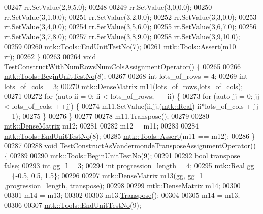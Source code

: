 \begin{DoxyCode}
00247   rr.SetValue(2,9,5.0);
00248 
00249   rr.SetValue(3,0,0.0);
00250   rr.SetValue(3,1,0.0);
00251   rr.SetValue(3,2,0.0);
00252   rr.SetValue(3,3,0.0);
00253   rr.SetValue(3,4,0.0);
00254   rr.SetValue(3,5,6.0);
00255   rr.SetValue(3,6,7.0);
00256   rr.SetValue(3,7,8.0);
00257   rr.SetValue(3,8,9.0);
00258   rr.SetValue(3,9,10.0);
00259 
00260   \hyperlink{classmtk_1_1Tools_ad8cf0085133dd40c913fe195bc5b9694}{mtk::Tools::EndUnitTestNo}(7);
00261   \hyperlink{classmtk_1_1Tools_aa311fada9255627d06c56b1e4fedce9e}{mtk::Tools::Assert}(m10 == rr);
00262 \}
00263 
00264 \textcolor{keywordtype}{void} TestConstructWithNumRowsNumColsAssignmentOperator() \{
00265 
00266   \hyperlink{classmtk_1_1Tools_a26ee906d28523378522a75e25c3a4e19}{mtk::Tools::BeginUnitTestNo}(8);
00267 
00268   \textcolor{keywordtype}{int} lots\_of\_rows = 4;
00269   \textcolor{keywordtype}{int} lots\_of\_cols = 3;
00270   \hyperlink{classmtk_1_1DenseMatrix}{mtk::DenseMatrix} m11(lots\_of\_rows,lots\_of\_cols);
00271 
00272   \textcolor{keywordflow}{for} (\textcolor{keyword}{auto} ii = 0; ii < lots\_of\_rows; ++ii) \{
00273     \textcolor{keywordflow}{for} (\textcolor{keyword}{auto} jj = 0; jj < lots\_of\_cols; ++jj) \{
00274       m11.SetValue(ii,jj,(\hyperlink{group__c01-roots_gac080bbbf5cbb5502c9f00405f894857d}{mtk::Real}) ii*lots\_of\_cols + jj + 1);
00275     \}
00276   \}
00277 
00278   m11.Transpose();
00279 
00280   \hyperlink{classmtk_1_1DenseMatrix}{mtk::DenseMatrix} m12;
00281 
00282   m12 = m11;
00283 
00284   \hyperlink{classmtk_1_1Tools_ad8cf0085133dd40c913fe195bc5b9694}{mtk::Tools::EndUnitTestNo}(8);
00285   \hyperlink{classmtk_1_1Tools_aa311fada9255627d06c56b1e4fedce9e}{mtk::Tools::Assert}(m11 == m12);
00286 \}
00287 
00288 \textcolor{keywordtype}{void} TestConstructAsVandermondeTransposeAssignmentOperator() \{
00289 
00290   \hyperlink{classmtk_1_1Tools_a26ee906d28523378522a75e25c3a4e19}{mtk::Tools::BeginUnitTestNo}(9);
00291 
00292   \textcolor{keywordtype}{bool} transpose = \textcolor{keyword}{false};
00293   \textcolor{keywordtype}{int} gg\_l = 3;
00294   \textcolor{keywordtype}{int} progression\_length = 4;
00295   \hyperlink{group__c01-roots_gac080bbbf5cbb5502c9f00405f894857d}{mtk::Real} gg[] = \{-0.5, 0.5, 1.5\};
00296 
00297   \hyperlink{classmtk_1_1DenseMatrix}{mtk::DenseMatrix} m13(gg, gg\_l ,progression\_length, transpose);
00298 
00299   \hyperlink{classmtk_1_1DenseMatrix}{mtk::DenseMatrix} m14;
00300 
00301   m14 = m13;
00302 
00303   m13.\hyperlink{classmtk_1_1DenseMatrix_a71d9c07ca66e88d97d1fd5012f43138b}{Transpose}();
00304 
00305   m14 = m13;
00306 
00307   \hyperlink{classmtk_1_1Tools_ad8cf0085133dd40c913fe195bc5b9694}{mtk::Tools::EndUnitTestNo}(9);

\end{DoxyCode}
